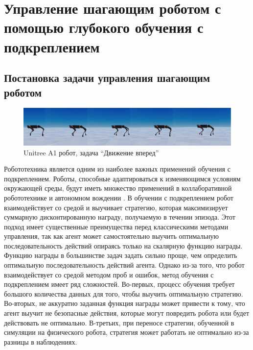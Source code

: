 \chapter{Управление шагающим роботом с помощью глубокого обучения с подкреплением}\label{ch:ch3}

\section{Постановка задачи управления шагающим роботом}


\begin{figure}[ht]
    \includegraphics[width=1\textwidth]{images/move_forward.png}
    \caption{Unitree A1 робот, задача ``Движение вперед''}
    \label{fig:mv_forward}
\end{figure}


Робототехника является одним из наиболее важных применений обучения с подкреплением. Роботы, способные адаптироваться к изменяющимся условиям окружающей среды, будут иметь множество применений в коллаборативной робототехнике \cite{levine2016end} и автономном вождении \cite{kiran2021deep}. В обучении с подкреплением робот взаимодействует со средой и выучивает стратегию, которая максимизирует суммарную дисконтированную награду, получаемую в течении эпизода.  Этот подход имеет существенные преимущества перед классическими методами управления, так как агент может самостоятельно выучить оптимальную последовательность действий опираясь только на скалярную функцию награды. Функцию награды в большинстве задач задать сильно проще, чем определить оптимальную последовательность действий агента. Однако из-за того, что робот взаимодействует со средой методом проб и ошибок, метод обучения с подкреплением имеет ряд сложностей. Во-первых, процесс обучения требует большого количества данных для того, чтобы выучить оптимальную стратегию. Во-вторых, не аккуратно заданная функция награды может привести к тому, что агент выучит не безопасные действия, которые могут повредить робота или будет действовать не оптимально. В-третьих, при переносе стратегии, обученной в симуляции на физического робота, стратегия может работать не оптимально из-за разницы в наблюдениях. 

